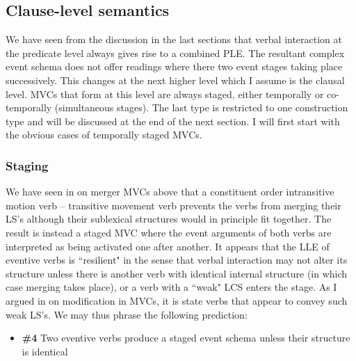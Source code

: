 \subsection{Clause-level semantics} \label{sec:clause-level}

We have seen from the discussion in the last sections that verbal interaction at the predicate level always gives rise to a combined PLE. The resultant complex event schema does not offer readings where there two event stages taking place successively. This changes at the next higher level which I assume is the clausal level. MVCs that form at this level are always staged, either temporally or co-temporally (simultaneous stages). The last type is restricted to one construction type and will be discussed at the end of the next section. I will first start with the obvious cases of temporally staged MVCs.

\subsubsection{Staging}\label{sec:staging}

We have seen in  on merger MVCs above that a constituent order intransitive motion verb -- transitive movement verb prevents the verbs from merging their LS's although their sublexical structures would in principle fit together. The result is instead a staged MVC where the event arguments of both verbs are interpreted as being activated one after another. It appears that the LLE of eventive verbs is ``resilient" in the sense that verbal interaction may not alter its structure unless there is another verb with identical internal structure (in which case merging takes place), or a verb with a ``weak" LCS enters the stage. As I argued in  on modification in MVCs, it is state verbs that appear to convey such weak LS's. We may thus phrase the following prediction:

\begin{itemize}
\item \textbf{\#4} Two eventive verbs produce a staged event schema unless their structure is identical
\end{itemize}

